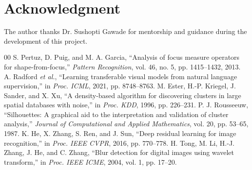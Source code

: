 \documentclass[conference]{IEEEtran}
\begin{document}
\section*{Acknowledgment}
The author thanks Dr. Sushopti Gawade for mentorship and guidance during the development of this project.

\begin{thebibliography}{00}
 S. Pertuz, D. Puig, and M. A. Garcia, ``Analysis of focus measure operators for shape-from-focus,'' \emph{Pattern Recognition}, vol. 46, no. 5, pp. 1415--1432, 2013.
 A. Radford \emph{et al.}, ``Learning transferable visual models from natural language supervision,'' in \emph{Proc. ICML}, 2021, pp. 8748--8763.
 M. Ester, H.-P. Kriegel, J. Sander, and X. Xu, ``A density-based algorithm for discovering clusters in large spatial databases with noise,'' in \emph{Proc. KDD}, 1996, pp. 226--231.
 P. J. Rousseeuw, ``Silhouettes: A graphical aid to the interpretation and validation of cluster analysis,'' \emph{Journal of Computational and Applied Mathematics}, vol. 20, pp. 53--65, 1987.
 K. He, X. Zhang, S. Ren, and J. Sun, ``Deep residual learning for image recognition,'' in \emph{Proc. IEEE CVPR}, 2016, pp. 770--778.
 H. Tong, M. Li, H.-J. Zhang, J. He, and C. Zhang, ``Blur detection for digital images using wavelet transform,'' in \emph{Proc. IEEE ICME}, 2004, vol. 1, pp. 17--20.
\end{thebibliography}
\end{document}
